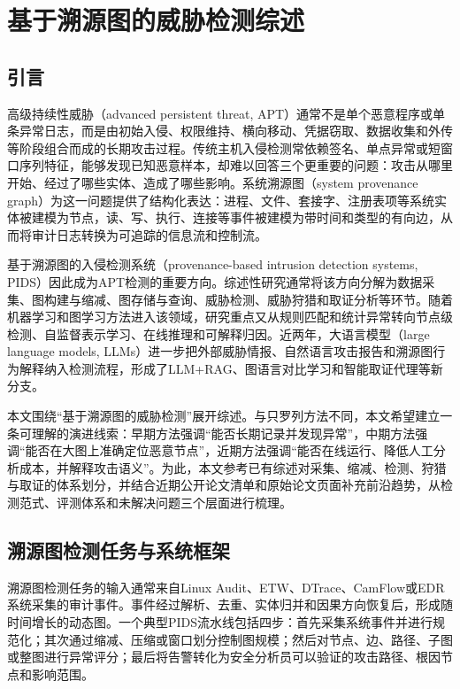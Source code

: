 \chapter{基于溯源图的威胁检测综述}

\section{引言}

高级持续性威胁（advanced persistent threat, APT）通常不是单个恶意程序或单条异常日志，而是由初始入侵、权限维持、横向移动、凭据窃取、数据收集和外传等阶段组合而成的长期攻击过程。传统主机入侵检测常依赖签名、单点异常或短窗口序列特征，能够发现已知恶意样本，却难以回答三个更重要的问题：攻击从哪里开始、经过了哪些实体、造成了哪些影响。系统溯源图（system provenance graph）为这一问题提供了结构化表达：进程、文件、套接字、注册表项等系统实体被建模为节点，读、写、执行、连接等事件被建模为带时间和类型的有向边，从而将审计日志转换为可追踪的信息流和控制流。

基于溯源图的入侵检测系统（provenance-based intrusion detection systems, PIDS）因此成为APT检测的重要方向。综述性研究通常将该方向分解为数据采集、图构建与缩减、图存储与查询、威胁检测、威胁狩猎和取证分析等环节\citep{zipperle2023survey,leng2022review}。随着机器学习和图学习方法进入该领域，研究重点又从规则匹配和统计异常转向节点级检测、自监督表示学习、在线推理和可解释归因\citep{li2025intelligent}。近两年，大语言模型（large language models, LLMs）进一步把外部威胁情报、自然语言攻击报告和溯源图行为解释纳入检测流程，形成了LLM+RAG、图语言对比学习和智能取证代理等新分支\citep{omniseq2025,provseek2025,aptcglp2025}。

本文围绕“基于溯源图的威胁检测”展开综述。与只罗列方法不同，本文希望建立一条可理解的演进线索：早期方法强调“能否长期记录并发现异常”，中期方法强调“能否在大图上准确定位恶意节点”，近期方法强调“能否在线运行、降低人工分析成本，并解释攻击语义”。为此，本文参考已有综述对采集、缩减、检测、狩猎与取证的体系划分\citep{zipperle2023survey,leng2022review,li2025intelligent}，并结合近期公开论文清单和原始论文页面补充前沿趋势\citep{xythink2026papers}，从检测范式、评测体系和未解决问题三个层面进行梳理。

\section{溯源图检测任务与系统框架}

溯源图检测任务的输入通常来自Linux Audit、ETW、DTrace、CamFlow或EDR系统采集的审计事件。事件经过解析、去重、实体归并和因果方向恢复后，形成随时间增长的动态图。一个典型PIDS流水线包括四步：首先采集系统事件并进行规范化；其次通过缩减、压缩或窗口划分控制图规模；然后对节点、边、路径、子图或整图进行异常评分；最后将告警转化为安全分析员可以验证的攻击路径、根因节点和影响范围。

